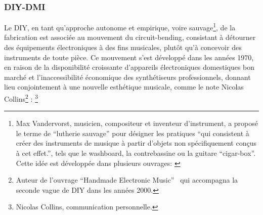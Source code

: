 \subsubsection{DIY-DMI}

\noindent Le \gls{DIY}, en tant qu'approche autonome et empirique, voire sauvage\footnote{Max Vandervorst, musicien, compositeur et inventeur d'instrument, a proposé le terme de ``lutherie sauvage'' pour désigner les pratiques ``qui consistent à créer des instruments de musique à partir d'objets non spécifiquement conçus à cet effet.'', tels que le washboard, la contrebassine ou la guitare ``cigar-box''. Cette idée est développée dans plusieurs ouvrages: \cite{vandervorst_lutherie_1997, vandervorst_instruments_2012}}, de la fabrication est associée au mouvement du \gls{circuit-bending}, consistant à détourner des équipements électroniques à des fins musicales, plutôt qu'à concevoir des instruments de toute pièce. Ce mouvement s'est développé dans les années 1970, en raison de la disponibilité croissante d'appareils électroniques domestiques bon marché et l'inaccessibilité économique des synthétiseurs professionnels, donnant lieu conjointement à une nouvelle esthétique musicale, comme le note Nicolas Collins\footnote{Auteur de l'ouvrage ``Handmade Electronic Music''~\cite{collins_handmade_2006} qui accompagna la seconde vague de \gls{DIY} dans les années 2000.} :  \footnote{ Nicolas Collins, communication personnelle.}\\
